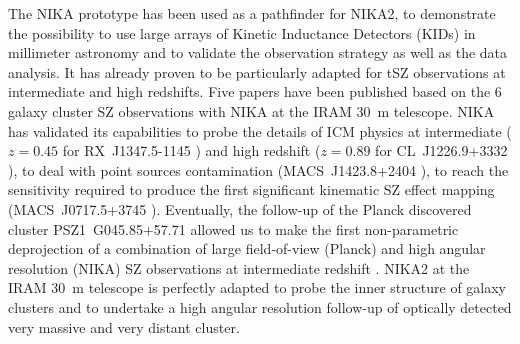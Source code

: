 \documentclass[11pt,a4paper,twoside,graphicx,color]{article}
\begin{document}
The NIKA prototype has been used as a pathfinder for NIKA2, to demonstrate the possibility to use large arrays of Kinetic Inductance Detectors (KIDs) in millimeter astronomy and to validate the observation strategy as well as the data analysis. It has already proven to be particularly adapted for tSZ observations at intermediate and high redshifts. Five papers have been published based on the 6 galaxy cluster SZ observations with NIKA at the IRAM 30~m telescope. NIKA has validated its capabilities to probe the details of ICM physics at intermediate ($z=0.45$ for RX~J1347.5-1145 \cite{ada14}) and high redshift ($z=0.89$ for CL~J1226.9+3332 \cite{ada15}), to deal with point sources contamination (MACS~J1423.8+2404 \cite{ada16a}), to reach the sensitivity required to produce the first significant kinematic SZ effect mapping (MACS~J0717.5+3745 \cite{ada16b}). Eventually, the follow-up of the Planck discovered cluster PSZ1~G045.85+57.71 allowed us to make the first non-parametric deprojection of a combination of large field-of-view (Planck) and high angular resolution (NIKA) SZ observations at intermediate redshift \cite{rup16}. NIKA2 at the IRAM 30~m telescope is perfectly adapted to probe the inner structure of galaxy clusters and to undertake a high angular resolution follow-up of optically detected very massive and very distant cluster.

\end{document}
